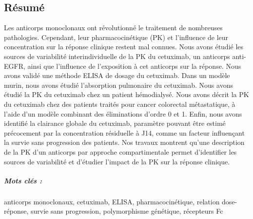 \begin{vcenterpage}
\chapter*{Résumé}

Les anticorps monoclonaux ont révolutionné le traitement de nombreuses pathologies. Cependant, leur pharmacocinétique (PK) et l'influence de leur concentration sur la réponse clinique restent mal connues. Nous avons étudié les sources de variabilité interindividuelle de la PK du cetuximab, un anticorps anti-EGFR, ainsi que l'influence de l'exposition à cet anticorps sur la réponse. Nous avons validé une méthode ELISA de dosage du cetuximab. Dans un modèle murin, nous avons étudié l'absorption pulmonaire du cetuximab. Nous avons étudié la PK du cetuximab chez un patient hémodialysé. Nous avons décrit la PK du cetuximab chez des patients traités pour cancer colorectal métastatique, à l'aide d'un modèle combinant des éliminations d'ordre 0 et 1. Enfin, nous avons identifié la clairance globale du cetuximab, paramètre pouvant être estimé précocement par la concentration résiduelle à J14, comme un facteur influençant la survie sans progression des patients. Nos travaux montrent qu'une description de la PK d'un anticorps par approche compartimentale permet d'identifier les sources de variabilité et d'étudier l'impact de la PK sur la réponse clinique.
\paragraph*{Mots clés :} anticorps monoclonaux, cetuximab, ELISA, pharmacocinétique, relation dose-réponse, survie sans progression, polymorphisme génétique, récepteurs Fc
\end{vcenterpage}